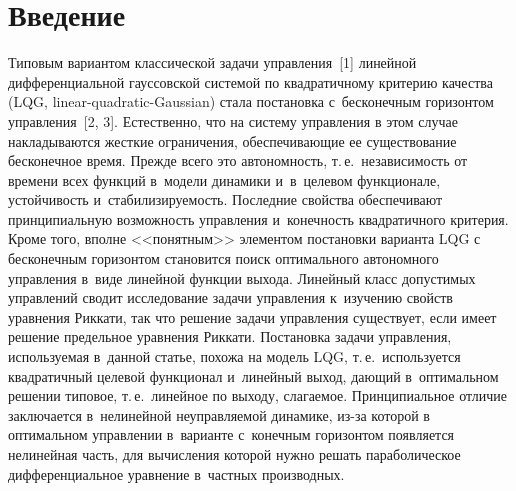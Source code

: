 
  



\thispagestyle{headings}

\begin{multicols}{2}

\label{st\stat}

\section{Введение}

     Типовым вариантом классической задачи управ\-ле\-ния~[1] линейной 
дифференциальной гауссовской системой по квад\-ра\-тич\-но\-му критерию 
качества (LQG, linear-quadratic-Gaussian) стала \mbox{постановка} с~бесконечным горизонтом  
управ\-ле\-ния~[2, 3]. Естественно, что на сис\-те\-му управ\-ле\-ния в этом 
случае накладываются жесткие ограничения, обес\-пе\-чи\-ва\-ющие ее 
существование бесконечное время. Прежде всего это автономность, т.\,е.\ 
независимость от времени всех функций в~модели динамики и~в~целевом 
функционале, устой\-чи\-вость и~ста\-би\-ли\-зи\-ру\-емость. Последние свойства 
обеспечивают принципиальную воз\-мож\-ность управ\-ле\-ния и~ко\-неч\-ность 
квадратичного критерия. Кроме того, вполне <<понятным>> элементом 
постановки варианта LQG с бесконечным горизонтом становится поиск 
оптимального автономного управ\-ле\-ния в~виде линейной функции выхода. 
Линейный класс допустимых управ\-ле\-ний сводит исследование задачи 
управления к~изуче\-нию свойств уравнения Риккати, так что решение задачи 
управления существует, если имеет решение предельное уравнения Риккати. 
Постановка задачи управ\-ле\-ния, ис\-поль\-зу\-емая в~данной статье, похожа на 
модель LQG, т.\,е.\ используется квад\-ра\-тич\-ный целевой функционал 
и~линейный выход, дающий в~оптимальном решении типовое, т.\,е.\ 
линейное по выходу, сла\-га\-емое. Принципиальное отличие заключается 
в~нелинейной не\-управ\-ля\-емой динамике, из-за которой в оптимальном 
управ\-ле\-нии в~варианте с~конечным горизонтом появляется нелинейная 
часть, для вы\-чис\-ле\-ния которой нужно решать параболическое 
дифференциальное урав\-не\-ние в~част\-ных производных. 


\end{multicols}
